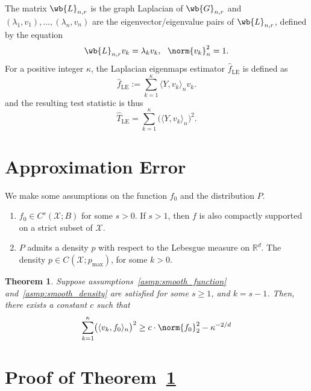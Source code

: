 \documentclass{article}
\newcommand{\Reals}{\mathbb{R}}
\newcommand{\1}{\mathbf{1}}
\newcommand{\Xset}{\mathcal{X}}
\newcommand{\dotp}[2]{\langle #1, #2 \rangle}
\newcommand{\wh}[1]{\widehat{#1}}
\newcommand{\LE}{\mathrm{LE}}
\theoremstyle{alden}
\theoremstyle{aldenthm}
\newtheorem{theorem}{Theorem}
\theoremstyle{definition}
\theoremstyle{remark}
\begin{document}
The matrix $\wb{L}_{n,r}$ is the graph Laplacian of $\wb{G}_{n,r}$ and $(\lambda_1,v_1),\ldots,(\lambda_n,v_n)$ are the eigenvector/eigenvalue pairs of $\wb{L}_{n,r}$, defined by the equation
\begin{equation*}
\wb{L}_{n,r} v_k = \lambda_k v_k,~~ \norm{v_k}_n^2 = 1.
\end{equation*}
For a positive integer $\kappa$, the Laplacian eigenmaps estimator $\wh{f}_{\LE}$ is defined as 
\begin{equation*}
\wh{f}_{\LE} := \sum_{k = 1}^{\kappa} \dotp{Y}{v_k}_n v_k.
\end{equation*}
and the resulting test statistic is thus
\begin{equation*}
\wh{T}_{\LE} = \sum_{k = 1}^{\kappa} \bigl(\dotp{Y}{v_k}_n\bigr)^2.
\end{equation*}

\section{Approximation Error}

We make some assumptions on the function $f_0$ and the distribution $P$.

\begin{enumerate}[label=(A\arabic*)]
	\item 
	\label{asmp:smooth_function}
	$f_0 \in C^{s}(\Xset;B)$ for some $s > 0$. If $s > 1$, then $f$ is also compactly supported on a strict subset of $\Xset$.
	
	\item 
	\label{asmp:smooth_density}
	$P$ admits a density $p$ with respect to the Lebesgue measure on $\Reals^d$. The density $p \in C^{}(\Xset;p_{\max})$, for some $k > 0$.
\end{enumerate}

\begin{theorem}
	\label{thm:approximation_error}
	Suppose assumptions~\ref{asmp:smooth_function} and~\ref{asmp:smooth_density} are satisfied for some $s \geq 1$, and $k = s - 1$. Then, there exists a constant $c$ such that 
	\begin{equation*}
	\sum_{k = 1}^{\kappa} \bigl(\dotp{v_k}{f_0}_n\bigr)^2 \geq c \cdot \norm{f_0}_2^2 - \kappa^{-2/d}
	\end{equation*}
\end{theorem}

\section{Proof of Theorem~\ref{thm:approximation_error}}
\end{document}
